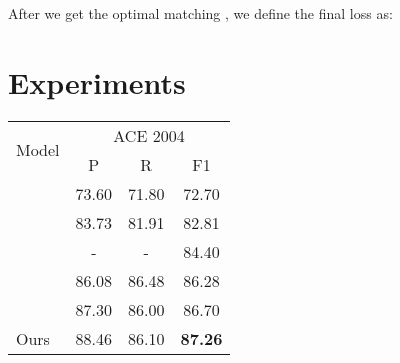 \documentclass{article}
\begin{document}
After we get the optimal matching , we define the final loss  as:



\section{Experiments}

\begin{table}
\centering
\begin{tabular}{lccc}
\toprule
\multirow{2}{*}{Model}   & \multicolumn{3}{c}{ACE 2004}  \\
 \cmidrule(lr){2-4} 
& P  & R & F1  \\
\midrule



\citep{katiyar2018nested} 
&  73.60 &  71.80 &  72.70 \\
\citep{shibuya2019nested}   & 83.73 & 81.91 & 82.81\\
\citep{strakova2019neural}  & - & - &  84.40  \\
\citep{jue2020pyramid}       & 86.08  & 86.48  & 86.28     \\
\citep{yu2020named}       & 87.30  & 86.00  & 86.70     \\
\midrule
Ours    & 88.46  & 86.10  & \textbf{87.26}  \\


\end{tabular}
\end{table}
\end{document}

